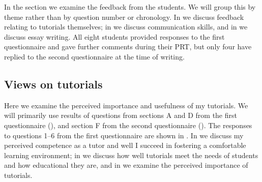 In the section we examine the feedback from the students. We will group this by theme rather than by question number or chronology. In  we discuss feedback relating to tutorials themselves; in  we discuss communication skills, and in  we discuss essay writing. All eight students provided responses to the first questionnaire and gave further comments during their PRT, but only four have replied to the second questionnaire at the time of writing.

\subsection{Views on tutorials}\label{sec:tutor-results}

Here we examine the perceived importance and usefulness of my tutorials. We will primarily use results of questions from sections A and D from the first questionnaire (), and section F from the second questionnaire (). The responses to questions 1--6 from the first questionnaire are shown in . In  we discuss my perceived competence as a tutor and well I succeed in fostering a comfortable learning environment; in  we discuss how well tutorials meet the needs of students and how educational they are, and in  we examine the perceived importance of tutorials.

